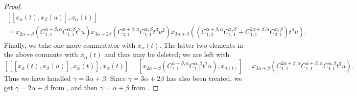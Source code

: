 \documentclass[11pt]{article}
\begin{document}
\begin{proof}
\begin{multline}
         [[x_\alpha(t), x_\beta(u)], x_\alpha(t)] \\ =    
         x_{2\alpha+\beta}(C_{1,1}^{\alpha+\beta,\alpha}C_{1,1}^{\alpha,\beta}t^2u)
         x_{3\alpha+2\beta}(C_{2,1}^{\alpha+\beta,\alpha}C_{1,1}^{\alpha,\beta} t^3u^2)
         x_{3\alpha+\beta}((C_{1,2}^{\alpha+\beta,\alpha}C_{1,1}^{\alpha,\beta} +C_{1,1}^{2\alpha+\beta,\alpha}C_{2,1}^{\alpha,\beta})t^3u).
    \end{multline}
    Finally, we take one more commutator with $x_\alpha(t)$. The latter two elements in the above commute with $x_\alpha(t)$ and thus may be deleted; we are left with
    \[
        [[[x_\alpha(t), x_\beta(u)], x_\alpha(t)], x_\alpha(t)] =[x_{2\alpha+\beta}(C_{1,1}^{\alpha+\beta,\alpha}C_{1,1}^{\alpha,\beta}t^2u), x_{\alpha(t)}] = x_{3\alpha+\beta}(C_{1,1}^{2\alpha+\beta,\alpha}C_{1,1}^{\alpha+\beta,\alpha}C_{1,1}^{\alpha,\beta}t^3u).
    \]
    Thus we have handled $\gamma = 3\alpha+\beta$.  Since $\gamma = 3\alpha+2\beta$ has also been treated, we get $\gamma = 2\alpha+\beta$ from , and then $\gamma = \alpha+\beta$ from .
\end{proof}

\end{document}
